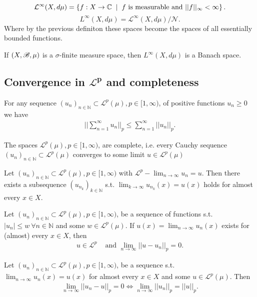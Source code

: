 \begin{definition}
    $$\mathcal L^\infty(X,d\mu) = \left\{ f:X\rightarrow \mathbb{C}\hspace{2mm}|\hspace{2mm} f\text{ is measurable and }||f||_\infty <\infty \right\}.$$
    $$L^\infty (X,d\mu) =\mathcal L^\infty(X,d\mu)/\mathcal N. $$
    Where by the previous definiton these spaces become the spaces of all essentially bounded functions. 
\end{definition}
\begin{theorem}
    If $(X,\mathscr{B},\mu)$ is a $\sigma$-finite measure space, then $L^\infty(X,d\mu)$ is a Banach space.
\end{theorem}
\subsection*{Convergence in \(\boldsymbol{\mathcal{L}^p}\) and completeness}
\begin{lemma}
    For any sequence \((u_n)_{n\in\mathbb{N}}\subset\mathcal{L}^p(\mu), p\in[1,\infty)\), of positive functions \(u_n\geq 0\) we have
    \begin{align*}
        \Big\vert \Big\vert \sum\limits^{\infty}_{n=1} u_n \Big\vert\Big\vert_p \leq \sum\limits_{n=1}^{\infty}\vert\vert u_n\vert\vert_p.
    \end{align*}
\end{lemma}
\begin{theorem}
    The spaces \(\mathcal{L}^p(\mu), p\in[1,\infty)\), are complete, i.e. every Cauchy sequence \((u_n)_{n\in\mathbb{N}}\subset\mathcal{L}^p(\mu)\) 
    converges to some limit \(u\in\mathcal{L}^p(\mu)\)
\end{theorem}
\begin{corollary}
    Let \((u_n)_{n\in\mathbb{N}}\subset \mathcal{L}^p(\mu), p\in[1,\infty)\) with \(\mathcal{L}^p-\lim_{n\rightarrow\infty}u_n=u\). Then there 
    exists a subsequence \((u_{n_k})_{k\in\mathbb{N}}\) s.t. \(\lim_{k\rightarrow\infty}u_{n_k}(x)=u(x)\) holds for almost every \(x\in X\).
\end{corollary}
\begin{theorem}
    Let \((u_n)_{n\in\mathbb{N}}\subset\mathcal{L}^p(\mu),p\in[1,\infty)\), be a sequence of functions s.t. \(|u_n|\leq w\ \forall n\in\mathbb{N}\)
    and some \(w\in\mathcal{L}^p(\mu)\). If \(u(x)=\lim_{n\rightarrow\infty}u_n(x)\) exists for (almost) every \(x\in X\), then
    \begin{align*}
        u\in\mathcal{L}^p &\text{ and } \lim\limits_{n\rightarrow\infty}||u-u_n||_p =0.
    \end{align*}
\end{theorem}
\begin{theorem}
    Let \((u_n)_{n\in\mathbb{N}}\subset\mathcal{L}^p(\mu),p\in[1,\infty)\), be a sequence s.t. \(\lim_{n\rightarrow\infty}u_n(x)=u(x)\)
    for almost every \(x\in X\) and some \(u\in\mathcal{L}^p(\mu)\). Then
    \begin{align*}
        \lim\limits_{n\rightarrow\infty}||u_n-u||_p = 0 \Longleftrightarrow \lim\limits_{n\rightarrow\infty} ||u_n||_p = ||u||_p.
    \end{align*}
\end{theorem}